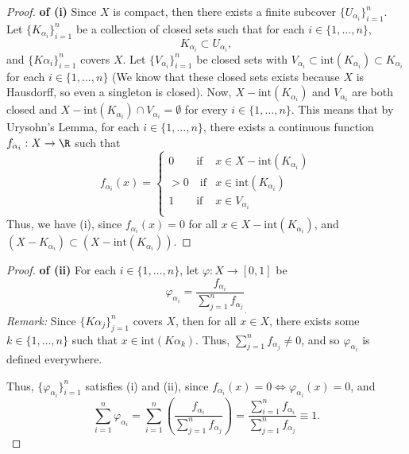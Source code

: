 \documentclass[letterpaper]{article}
\begin{document}
\begin{enumerate}
\begin{proof} \textbf{of (i)}
Since $X$ is compact, then there exists a finite subcover $\{U_{\alpha_i}\}_{i=1}^n$. Let $\{K_{\alpha_i}\}_{i=1}^n$ be a collection of closed sets such that for each $i\in\{1, \ldots, n\}$, 
$$K_{\alpha_i} \subset U_{\alpha_i},$$
and $\{K\alpha_i\}_{i=1}^n$ covers $X$.
Let $\{V_{\alpha_i}\}_{i=1}^n$ be closed sets with $V_{\alpha_i} \subset \text{int}(K_{\alpha_i}) \subset K_{\alpha_i}$ for each $i\in\{1, \ldots, n\}$ (We know that these closed sets exists because $X$ is Hausdorff, so even a singleton is closed).
Now, $X-\text{int}(K_{\alpha_i})$ and $V_{\alpha_i}$ are both closed and $X-\text{int}(K_{\alpha_i}) \cap V_{\alpha_i} = \emptyset$ for every $i\in\{1, \ldots, n\}$. This means that by Urysohn's Lemma, for each $i\in\{1, \ldots, n\}$, there exists a continuous function $f_{\alpha_i} :X\to\R$ such that
$$
f_{\alpha_i}(x)= 
\begin{cases}
0 \quad \quad \text{if} &x \in X-\text{int}(K_{\alpha_i})\\
>0 \quad \text{if} &x \in \text{int}(K_{\alpha_i})\\
1 \quad \quad \text{if} & x\in V_{\alpha_i}\\
\end{cases}
$$
Thus, we have (i), since $f_{\alpha_i}(x)=0$ for all $x\in X-\text{int}(K_{\alpha_i})$, and $(X-K_{\alpha_i})\subset (X-\text{int}(K_{\alpha_i}))$.
\end{proof}
\begin{proof} \textbf{of (ii)}
For each $i\in\{1, \ldots, n\}$, let $\varphi : X \to [0,1]$ be 
$$\varphi_{\alpha_i} = \frac{f_{\alpha_i}}{\sum_{j=1}^n f_{\alpha_j}}_\textbf{.}$$
\textit{Remark:} Since $\{K\alpha_j\}_{j=1}^n$ covers $X$, then for all $x\in X$, there exists some $k\in\{1, \ldots, n\}$ such that $x\in \text{int}(K\alpha_k)$. Thus, $\sum\limits_{j=1}^n f_{\alpha_j} \neq 0$, and so $\varphi_{\alpha_i}$ is defined everywhere.

Thus, $\{\varphi_{\alpha_i}\}_{i=1}^n$ satisfies (i) and (ii), since $f_{\alpha_i}(x)=0 \iff \varphi_{\alpha_i}(x)=0$, and 
$$\sum_{i=1}^n \varphi_{\alpha_i} = \sum_{i=1}^n \left( \frac{f_{\alpha_i}}{\sum_{j=1}^n f_{\alpha_j}} \right) = \frac{\sum_{i=1}^n f_{\alpha_i}}{\sum_{j=1}^n f_{\alpha_j}} \equiv 1.$$
\end{proof}
\end{enumerate}
\end{document}
